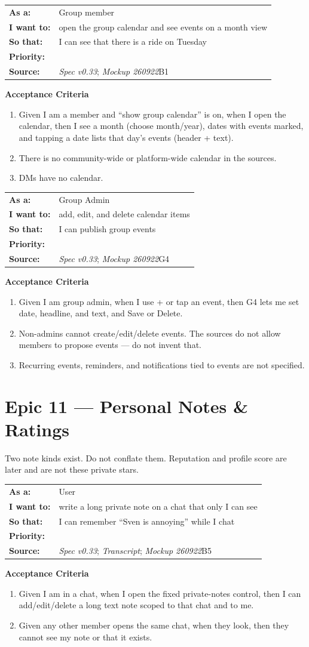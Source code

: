 \documentclass[11pt,a4paper]{article}
\makeatletter
\newcommand{\priPzero}{\colorbox{p0}{\makebox[4.6em]{\textcolor{white}{\scriptsize\bfseries P0 V1}}}}
\newcommand{\srcSpec}{\textit{Spec v0.33}}
\newcommand{\srcTx}{\textit{Transcript}}
\newcommand{\srcMock}{\textit{Mockup 260922}}
\newenvironment{story}[1]{%
  \Needspace{10\baselineskip}%
  \vspace{0.7em}%
  \noindent
  \colorbox{navy}{\makebox[\dimexpr\textwidth-2\fboxsep\relax][l]{\textcolor{white}{\bfseries\ #1}}}%
  \par\vspace{0.35em}%
}{\par\vspace{0.55em}}
\newcommand{\storymeta}[5]{%
  \noindent
  \begin{tabularx}{\textwidth}{@{}>{\bfseries}l X@{}}
    As a: & #1 \\
    I want to: & #2 \\
    So that: & #3 \\
    Priority: & #4 \\
    Source: & #5 \\
  \end{tabularx}
  \par\vspace{0.3em}
}
\newcommand{\achead}{\noindent\textbf{Acceptance Criteria}\par}
\makeatother
\begin{document}
\begin{story}{CAL-001 --- View group calendar}
\storymeta{Group member}{open the group calendar and see events on a month view}{I can see that there is a ride on Tuesday}{\priPzero}{\srcSpec; \srcMock B1}
\achead
\begin{enumerate}
  \item Given I am a member and ``show group calendar'' is on, when I open the calendar, then I see a month (choose month/year), dates with events marked, and tapping a date lists that day's events (header + text).
  \item There is no community-wide or platform-wide calendar in the sources.
  \item DMs have no calendar.
\end{enumerate}
\end{story}

\begin{story}{CAL-002 --- Admin create, edit, delete calendar events}
\storymeta{Group Admin}{add, edit, and delete calendar items}{I can publish group events}{\priPzero}{\srcSpec; \srcMock G4}
\achead
\begin{enumerate}
  \item Given I am group admin, when I use + or tap an event, then G4 lets me set date, headline, and text, and Save or Delete.
  \item Non-admins cannot create/edit/delete events. The sources do not allow members to propose events --- do not invent that.
  \item Recurring events, reminders, and notifications tied to events are not specified.
\end{enumerate}
\end{story}

\section{Epic 11 --- Personal Notes \& Ratings}
Two note kinds exist. Do not conflate them. Reputation and profile score are later and are not these private stars.

\begin{story}{NOTE-001 --- Personal sticky note on a chat}
\storymeta{User}{write a long private note on a chat that only I can see}{I can remember ``Sven is annoying'' while I chat}{\priPzero}{\srcSpec; \srcTx; \srcMock B5}
\achead
\begin{enumerate}
  \item Given I am in a chat, when I open the fixed private-notes control, then I can add/edit/delete a long text note scoped to that chat and to me.
  \item Given any other member opens the same chat, when they look, then they cannot see my note or that it exists.
\end{enumerate}
\end{story}
\end{document}
